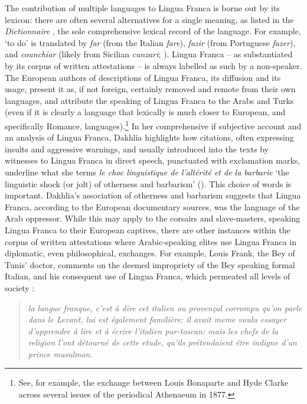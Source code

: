 \documentclass[output=paper]{langsci/langscibook}
\begin{document}
	The contribution of multiple languages to Lingua Franca is borne out by its lexicon: there are often several alternatives for a single meaning, as listed in the \textit{Dictionnaire} \citep{Anonymous1830}, the sole comprehensive lexical record of the language. For example, ‘to do’ is translated by \textit{far} (from the Italian \textit{fare}), \textit{fazir} (from Portuguese \textit{fazer}), and \textit{counchiar} (likely from Sicilian \textit{cunzari}; \citealt[316]{Cifoletti2004}). Lingua Franca – as substantiated by its corpus of written attestations – is always labelled as such by a non-speaker. The European authors of descriptions of Lingua Franca, its diffusion and its usage, present it as, if not foreign, certainly removed and remote from their own languages, and attribute the speaking of Lingua Franca to the Arabs and Turks (even if it is clearly a language that lexically is much closer to European, and specifically Romance, languages).\footnote{See, for example, the exchange between Louis Bonaparte and Hyde Clarke across several issues of the periodical Athenaeum in 1877.} In her comprehensive if subjective account and an  analysis of Lingua Franca, Dakhlia highlights how citations, often expressing insults and aggressive warnings, and usually introduced into the texts by witnesses to Lingua Franca in direct speech, punctuated with exclamation marks, underline what she terms \textit{le choc linguistique de l’altérité et de la barbarie} ‘the linguistic shock (or jolt) of otherness and barbarism’ (\citealt[351]{Dakhlia2008}). This choice of words is important. Dakhlia’s association of otherness and barbarism suggests that Lingua Franca, according to the European documentary sources, was the language of the Arab oppressor. While this may apply to the corsairs and slave-masters, speaking Lingua Franca to their European captives, there are other instances within the corpus of written attestations where Arabic-speaking elites use Lingua Franca in diplomatic, even philosophical, exchanges. For example, Louis Frank, the Bey of Tunis’ doctor, comments on the deemed impropriety of the Bey speaking formal Italian, and his consequent use of Lingua Franca, which permeated all levels of society \citep[70]{Frank1850}:
	
	\begin{quote}
		\textit{la langue franque, c’est à dire cet italien ou provençal corrompu qu’on parle dans le Levant, lui est également familière; il avait meme voulu essayer d’apprendre à lire et à écrire l’italien pur-toscan: mais les chefs de la religion l’ont détourné de cette etude, qu’ils prétendaient être indigne d’un prince musulman.}
	\end{quote}
	
\end{document}
